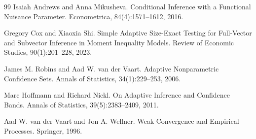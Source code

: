 \documentclass{article}
\begin{document}
\begin{thebibliography}{99}
   Isaiah Andrews and Anna Mikusheva. Conditional Inference with a Functional Nuisance Parameter. Econometrica, 84(4):1571--1612, 2016.

   Gregory Cox and Xiaoxia Shi. Simple Adaptive Size-Exact Testing for Full-Vector and Subvector Inference in Moment Inequality Models. Review of Economic Studies, 90(1):201--228, 2023.

   James M. Robins and Aad W. van der Vaart. Adaptive Nonparametric Confidence Sets. Annals of Statistics, 34(1):229--253, 2006.

   Marc Hoffmann and Richard Nickl. On Adaptive Inference and Confidence Bands. Annals of Statistics, 39(5):2383--2409, 2011.

   Aad W. van der Vaart and Jon A. Wellner. Weak Convergence and Empirical Processes. Springer, 1996.

\end{thebibliography}
\end{document}
